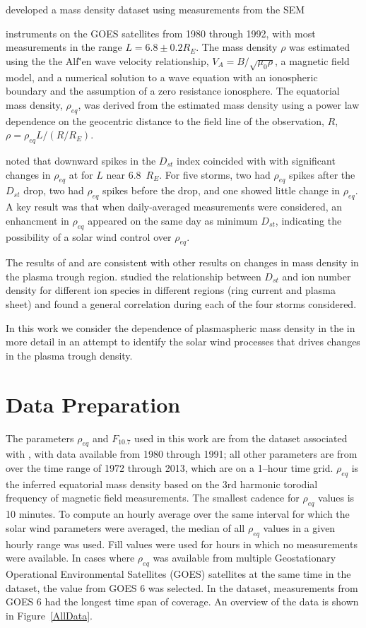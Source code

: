 \documentclass[10pt,twocolumn]{article}
\def\vnote#1\par{\textcolor{red}{\textbf{#1}}\\} %
\begin{document}
\cite{Takahashi2010} developed a mass density dataset using measurements from the SEM \vnote{Check instrument} instruments on the GOES satellites from 1980 through 1992, with most measurements in the range $L=6.8\pm0.2 R_E$. The mass density $\rho$ was estimated using the the Alf\v'en wave velocity relationship, $V_A=B/\sqrt{\mu_0\rho}$, a magnetic field model, and a numerical solution to a wave equation with an ionospheric boundary and the assumption of a zero resistance ionosphere.  The equatorial mass density, $\rho_{eq}$, was derived from the estimated mass density using a power law dependence on the geocentric distance to the field line of the observation, $R$, $\rho=\rho_{eq}L/(R/R_E)$. 

\cite{Takahashi2010} noted that downward spikes in the $D_{st}$ index coincided with with significant changes in $\rho_{eq}$ at for $L$ near 6.8~$R_E$. For five storms, two had $\rho_{eq}$ spikes after the $D_{st}$ drop, two had $\rho_{eq}$ spikes before the drop, and one showed little change in $\rho_{eq}$.  A key result was that when daily-averaged measurements were considered, an enhancment in $\rho_{eq}$ appeared on the same day as minimum $D_{st}$, indicating the possibility of a solar wind control over $\rho_{eq}$.

The results of \cite{Takahashi2006} and \cite{Takahashi2010} are consistent with other results on changes in mass density in the plasma trough region.  \cite{Yao2008} studied the relationship between $D_{st}$ and ion number density for different ion species in different regions (ring current and plasma sheet) and found a general correlation during each of the four storms considered.

In this work we consider the dependence of plasmaspheric mass density in the \cite{Takahashi2010} in more detail in an attempt to identify the solar wind processes that drives changes in the plasma trough density.

\section{Data Preparation}

The parameters $\rho_{eq}$ and $F_{10.7}$ used in this work are from the dataset associated with \cite{Denton}, with data available from 1980 through 1991; all other parameters are from \cite{Reconstruction} over the time range of 1972 through 2013, which are on a 1--hour time grid. $\rho_{eq}$ is the inferred equatorial mass density based on the 3rd harmonic torodial frequency of magnetic field measurements.  The smallest cadence for $\rho_{eq}$ values is 10 minutes.  To compute an hourly average over the same interval for which the solar wind parameters were averaged, the median of all $\rho_{eq}$ values in a given hourly range was used.  Fill values were used for hours in which no measurements were available.  In cases where $\rho_{eq}$ was available from multiple Geostationary Operational Environmental Satellites (GOES) satellites at the same time in the \cite{Denton} dataset, the value from GOES 6 was selected.  In the dataset, measurements from GOES 6 had the longest time span of coverage.  An overview of the data is shown in Figure~\ref{AllData}.
\end{document}

